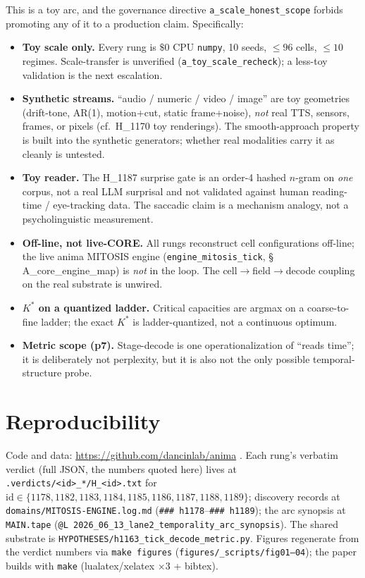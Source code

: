 \documentclass[11pt,a4paper]{article}
\newcommand{\Kstar}{K^{\!*}}
\begin{document}
This is a toy arc, and the governance directive \texttt{a\_scale\_honest\_scope}
forbids promoting any of it to a production claim. Specifically:

\begin{itemize}\itemsep0.25em
\item \textbf{Toy scale only.} Every rung is $\$0$ CPU \texttt{numpy}, 10 seeds,
  $\leq 96$ cells, $\leq 10$ regimes. Scale-transfer is unverified
  (\texttt{a\_toy\_scale\_recheck}); a less-toy validation is the next escalation.
\item \textbf{Synthetic streams.} ``audio / numeric / video / image'' are toy
  geometries (drift-tone, AR(1), motion+cut, static frame+noise), \emph{not} real
  TTS, sensors, frames, or pixels (cf.\ H\_1170 toy renderings). The
  smooth-approach property is built into the synthetic generators; whether real
  modalities carry it as cleanly is untested.
\item \textbf{Toy reader.} The H\_1187 surprise gate is an order-4 hashed
  $n$-gram on \emph{one} corpus, not a real LLM surprisal and not validated against
  human reading-time / eye-tracking data. The saccadic claim is a mechanism
  analogy, not a psycholinguistic measurement.
\item \textbf{Off-line, not live-CORE.} All rungs reconstruct cell configurations
  off-line; the live anima MITOSIS engine
  (\texttt{engine\_mitosis\_tick}, \S\,A\_core\_engine\_map) is \emph{not} in the
  loop. The cell$\to$field$\to$decode coupling on the real substrate is unwired.
\item \textbf{$\Kstar$ on a quantized ladder.} Critical capacities are argmax on a
  coarse-to-fine ladder; the exact $\Kstar$ is ladder-quantized, not a continuous
  optimum.
\item \textbf{Metric scope (p7).} Stage-decode is one operationalization of
  ``reads time''; it is deliberately not perplexity, but it is also not the only
  possible temporal-structure probe.
\end{itemize}

\section{Reproducibility}
\label{sec:repro}

Code and data: \url{https://github.com/dancinlab/anima} \citep{anima_repo}. Each rung's verbatim
verdict (full JSON, the numbers quoted here) lives at
\texttt{.verdicts/<id>\_*/H\_<id>.txt} for
$\text{id}\in\{1178,1182,1183,1184,1185,1186,1187,1188,1189\}$; discovery records
at \texttt{domains/MITOSIS-ENGINE.log.md} (\verb|### h1178|--\verb|### h1189|); the
arc synopsis at \texttt{MAIN.tape}
(\verb|@L 2026_06_13_lane2_temporality_arc_synopsis|). The shared substrate is
\texttt{HYPOTHESES/h1163\_tick\_decode\_metric.py}. Figures regenerate from the
verdict numbers via \texttt{make figures} (\texttt{figures/\_scripts/fig01--04});
the paper builds with \texttt{make} (lualatex/xelatex $\times 3$ + bibtex).
\end{document}
